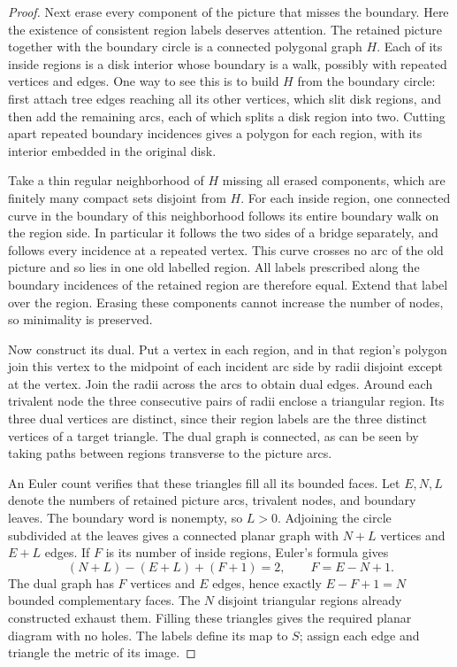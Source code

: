 \begin{proof}
Next erase every component of the picture that misses the boundary.
Here the existence of consistent region labels deserves attention.
The retained picture together with the boundary circle is a connected
polygonal graph $H$. Each of its inside regions is a disk interior whose
boundary is a walk, possibly with repeated vertices and edges. One way
to see this is to build $H$ from the boundary circle: first attach tree
edges reaching all its other vertices, which slit disk regions, and then
add the remaining arcs, each of which splits a disk region into two.
Cutting apart repeated boundary incidences gives a polygon for each
region, with its interior embedded in the original disk.

Take a thin regular neighborhood of $H$ missing all erased components,
which are finitely many compact sets disjoint from $H$. For each inside
region, one connected curve in the boundary of this neighborhood follows
its entire boundary walk on the region side. In particular it follows
the two sides of a bridge separately, and follows every incidence at a
repeated vertex. This curve crosses no arc of the old picture and so lies
in one old labelled region. All labels prescribed along the boundary
incidences of the retained region are therefore equal. Extend that label
over the region. Erasing these components cannot increase the number of nodes,
so minimality is preserved.

Now construct its dual. Put a vertex in each region, and in that
region's polygon join this vertex to the midpoint of each incident arc
side by radii disjoint except at the vertex. Join the radii across the
arcs to obtain dual edges. Around each trivalent node the three
consecutive pairs of radii enclose a triangular region. Its three dual
vertices are distinct, since their region labels are the three distinct
vertices of a target triangle. The dual graph is connected, as can be
seen by taking paths between regions transverse to the picture arcs.

An Euler count verifies that these triangles fill all its bounded
faces. Let $E,N,L$ denote the numbers of retained picture arcs, trivalent
nodes, and boundary leaves. The boundary word is nonempty, so $L>0$.
Adjoining the circle subdivided at the leaves gives a connected planar
graph with $N+L$ vertices and $E+L$ edges. If $F$ is its number of inside
regions, Euler's formula gives
\[
 (N+L)-(E+L)+(F+1)=2,
 \qquad F=E-N+1.
\]
The dual graph has $F$ vertices and $E$ edges, hence exactly
$E-F+1=N$ bounded complementary faces. The $N$ disjoint triangular
regions already constructed exhaust them. Filling these triangles gives
the required planar diagram with no holes. The labels define its map
to $S$; assign each edge and triangle the metric of its image.


\end{proof}
